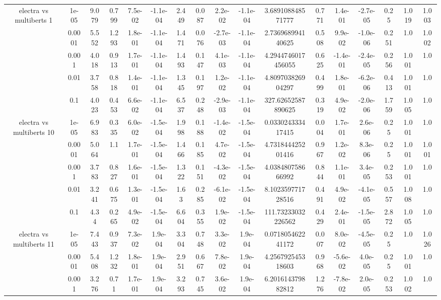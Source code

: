 \begin{tabular}{|c|c|c|c|c|c|c|c|c|c|c|c|c|c|c|c|c|}
\hline
\multirow{5}{*}{electra  vs multiberts 1} & 1e-05 & 9.079 & 0.799 & 7.5e-02 & -1.1e-04 & 2.449 & 0.087 & 2.2e-02 & -1.1e-04 & 3.689108848571777 & 0.771 & 1.4e-01 & -2.7e-05 & 0.25 & 1.019 & 1.003 \\
 & 0.0001 & 5.552 & 1.293 & 1.8e-01 & -1.1e-04 & 1.471 & 0.076 & -2.7e-03 & -1.1e-04 & 2.736968994140625 & 0.508 & 9.9e-02 & -1.0e-06 & 0.251 & 1.0 & 1.002 \\
 & 0.001 & 4.018 & 0.913 & 1.7e-01 & -1.1e-04 & 1.493 & 0.147 & 4.1e-03 & -1.1e-04 & 4.2944746017456055 & 0.625 & -1.4e-01 & -2.4e-05 & 0.256 & 1.001 & 1.0 \\
 & 0.01 & 3.758 & 0.818 & 1.4e-01 & -1.1e-04 & 1.345 & 0.197 & 1.2e-02 & -1.1e-04 & 4.809703826904297 & 0.499 & 1.8e-01 & -6.2e-06 & 0.413 & 1.001 & 1.0 \\
 & 0.1 & 4.023 & 0.453 & 6.6e-02 & -1.1e-04 & 6.537 & 0.248 & -2.9e-03 & -1.1e-04 & 327.62652587890625 & 0.319 & 4.9e-02 & -2.0e-06 & 1.759 & 1.005 & 1.0 \\
\hline
\multirow{5}{*}{electra  vs multiberts 10} & 1e-05 & 6.983 & 0.335 & 6.0e-02 & -1.5e-04 & 1.998 & 0.188 & -1.4e-02 & -1.5e-04 & 0.033024333417415 & 0.004 & 1.7e-01 & 2.6e-06 & 0.25 & 1.001 & 1.0 \\
 & 0.0001 & 5.064 & 1.1 & 1.7e-01 & -1.5e-04 & 1.466 & 0.185 & 4.7e-02 & -1.5e-04 & 4.731844425201416 & 0.967 & 1.2e-02 & 8.3e-06 & 0.25 & 1.001 & 1.001 \\
 & 0.001 & 3.783 & 0.827 & 1.6e-01 & -1.5e-04 & 1.322 & 0.151 & -4.3e-02 & -1.5e-04 & 4.038480758666992 & 0.844 & 1.1e-01 & 3.4e-05 & 0.253 & 1.001 & 1.0 \\
 & 0.01 & 3.241 & 0.675 & 1.3e-01 & -1.5e-04 & 1.63 & 0.285 & -6.1e-02 & -1.5e-04 & 8.102359771728516 & 0.491 & 4.9e-02 & -4.1e-05 & 0.557 & 1.008 & 1.0 \\
 & 0.1 & 4.34 & 0.265 & 4.9e-02 & -1.5e-04 & 6.604 & 0.355 & 1.9e-02 & -1.5e-04 & 111.73233032226562 & 0.429 & 2.4e-01 & -1.5e-05 & 2.872 & 1.005 & 1.0 \\
\hline
\multirow{5}{*}{electra  vs multiberts 11} & 1e-05 & 7.443 & 0.937 & 7.3e-02 & 1.9e-04 & 3.304 & 0.748 & 3.3e-02 & 1.9e-04 & 0.071805462241172 & 0.007 & 8.0e-02 & -4.5e-05 & 0.25 & 1.0 & 1.026 \\
 & 0.0001 & 5.408 & 1.232 & 1.8e-01 & 1.9e-04 & 2.951 & 0.667 & 7.8e-02 & 1.9e-04 & 4.256792545318603 & 0.968 & -5.6e-02 & 4.0e-05 & 0.25 & 1.001 & 1.0 \\
 & 0.001 & 3.276 & 0.71 & 1.7e-01 & 1.9e-04 & 3.293 & 0.745 & 3.6e-02 & 1.9e-04 & 6.201614379882812 & 1.276 & -7.8e-02 & 2.0e-05 & 0.253 & 1.002 & 1.0 \\

\end{tabular}
